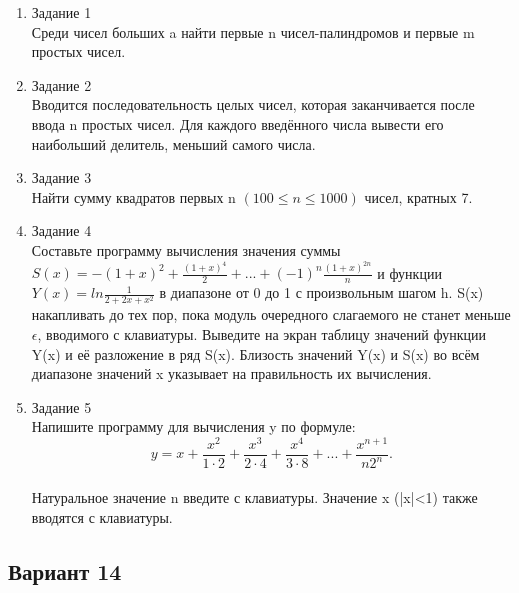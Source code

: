 \documentclass[a4paper]{article}
\begin{document}
	
	\begin{enumerate} 
		\item Задание 1 \\
		Среди чисел больших a найти первые n чисел-палиндромов и первые m простых чисел.\\
		\item Задание 2\\
		Вводится последовательность целых чисел, которая заканчивается после ввода n простых чисел.  Для каждого введённого числа вывести его наибольший делитель, меньший самого числа.\\
		\item Задание 3 \\
		Найти сумму квадратов первых n $(100 \le n \le 1000) $ чисел, кратных 7.\\
		\item Задание 4 \\ 
		Составьте программу вычисления значения суммы  $S(x)=-{(1+x)}^2+\frac{{(1+x)}^4}{2}+...+(-1)^n\frac{{(1+x)}^{2n}}{n}$
		и функции $Y(x)=ln\frac{1}{2+2x+x^2}$ в диапазоне от 0 до 1
		с произвольным шагом h.  S(x) накапливать до тех пор, пока модуль очередного слагаемого не станет меньше $\epsilon$, вводимого с клавиатуры. Выведите на экран таблицу значений функции Y(x) и её разложение в ряд S(x). Близость значений Y(x) и S(x) во всём диапазоне
		значений x указывает на правильность их вычисления.\\
		\item Задание 5 \\
		Напишите программу для вычисления y по формуле:\\
		$$y=x+\frac{x^2}{1\cdot2}+\frac{x^3}{2\cdot4}+\frac{x^4}{3\cdot8}+...+\frac{x^{n+1}}{n2^n}.$$\\
		Натуральное значение n введите с клавиатуры. Значение x (|x|<1) также вводятся с клавиатуры.\\
		
	\end{enumerate}
\newpage
		\begin{center}
		\subsection*{Вариант 14}
	\end{center}
	
\end{document}
